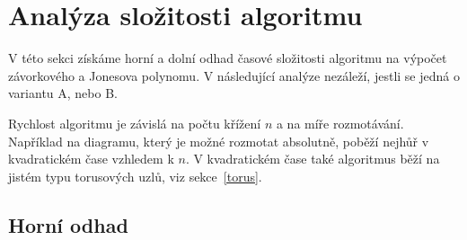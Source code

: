 \section{Analýza složitosti algoritmu}  \label{analyza}
V této sekci získáme horní a dolní odhad časové složitosti algoritmu na výpočet závorkového a Jonesova polynomu. V následující analýze nezáleží, jestli se jedná o variantu A, nebo B.

Rychlost algoritmu je závislá na počtu křížení $n$ a na míře rozmotávání. Například na diagramu, který je možné rozmotat absolutně, poběží nejhůř v kvadratickém čase vzhledem k $n$. V kvadratickém čase také algoritmus běží na jistém typu torusových uzlů, viz sekce~\ref{torus}.

\subsection{Horní odhad}



